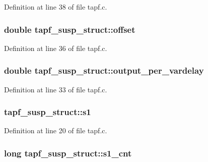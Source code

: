 Definition at line 38 of file tapf.\+c.

\subsubsection[{\texorpdfstring{offset}{offset}}]{\setlength{\rightskip}{0pt plus 5cm}double tapf\+\_\+susp\+\_\+struct\+::offset}\hypertarget{structtapf__susp__struct_a7e427a402a456d98ff88e23c0d123d13}{}\label{structtapf__susp__struct_a7e427a402a456d98ff88e23c0d123d13}


Definition at line 36 of file tapf.\+c.

\subsubsection[{\texorpdfstring{output\+\_\+per\+\_\+vardelay}{output_per_vardelay}}]{\setlength{\rightskip}{0pt plus 5cm}double tapf\+\_\+susp\+\_\+struct\+::output\+\_\+per\+\_\+vardelay}\hypertarget{structtapf__susp__struct_a9e355bfb525fc4c088cf6fe555610d1b}{}\label{structtapf__susp__struct_a9e355bfb525fc4c088cf6fe555610d1b}


Definition at line 33 of file tapf.\+c.

\subsubsection[{\texorpdfstring{s1}{s1}}]{ tapf\+\_\+susp\+\_\+struct\+::s1}\hypertarget{structtapf__susp__struct_ac2b5b62620012faed2299de6da96652d}{}\label{structtapf__susp__struct_ac2b5b62620012faed2299de6da96652d}


Definition at line 20 of file tapf.\+c.

\subsubsection[{\texorpdfstring{s1\+\_\+cnt}{s1_cnt}}]{\setlength{\rightskip}{0pt plus 5cm}long tapf\+\_\+susp\+\_\+struct\+::s1\+\_\+cnt}\hypertarget{structtapf__susp__struct_a58c1915be4d0de483c2bdcc3e1318e3b}{}\label{structtapf__susp__struct_a58c1915be4d0de483c2bdcc3e1318e3b}


